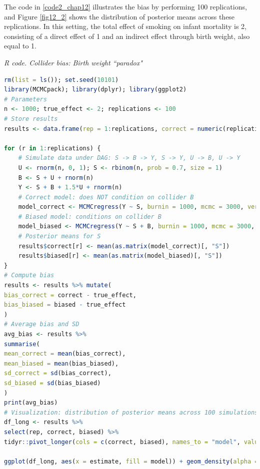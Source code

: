 The code in \ref{code2_chap12} illustrates the bias by performing 100 replications, and Figure \ref{fig12_2} shows the distribution of posterior means across these replications. In this setting, the total effect of smoking on infant mortality is 2, consisting of a direct effect of 1 and an indirect effect through birth weight, also equal to 1.

\begin{tcolorbox}[enhanced,width=4.67in,center upper,
	fontupper=\large\bfseries,drop shadow southwest,sharp corners]\label{code2_chap12}
	\textit{R code. Collider bias: Birth weight ``paradox"}
	\begin{VF}
		\begin{lstlisting}[language=R]		
rm(list = ls()); set.seed(10101)
library(MCMCpack); library(dplyr); library(ggplot2)
# Parameters
n <- 1000; true_effect <- 2; replications <- 100
# Store results
results <- data.frame(rep = 1:replications, correct = numeric(replications), biased = numeric(replications))

for (r in 1:replications) {
	# Simulate data under DAG: S -> B -> Y, S -> Y, U -> B, U -> Y
	U <- rnorm(n, 0, 1); S <- rbinom(n, prob = 0.7, size = 1)
	B <- S + U + rnorm(n)
	Y <- S + B + 1.5*U + rnorm(n)
	# Correct model: does NOT condition on collider B
	model_correct <- MCMCregress(Y ~ S, burnin = 1000, mcmc = 3000, verbose = FALSE)
	# Biased model: conditions on collider B
	model_biased <- MCMCregress(Y ~ S + B, burnin = 1000, mcmc = 3000, verbose = FALSE)
	# Posterior means for S
	results$correct[r] <- mean(as.matrix(model_correct)[, "S"])
	results$biased[r] <- mean(as.matrix(model_biased)[, "S"])
}
# Compute bias
results <- results %>% mutate(
bias_correct = correct - true_effect,
bias_biased = biased - true_effect
)
# Average bias and SD
avg_bias <- results %>%
summarise(
mean_correct = mean(bias_correct),
mean_biased = mean(bias_biased),
sd_correct = sd(bias_correct),
sd_biased = sd(bias_biased)
)
print(avg_bias)
# Visualization: distribution of posterior means across 100 simulations
df_long <- results %>%
select(rep, correct, biased) %>%
tidyr::pivot_longer(cols = c(correct, biased), names_to = "model", values_to = "estimate")

ggplot(df_long, aes(x = estimate, fill = model)) + geom_density(alpha = 0.5) + geom_vline(xintercept = true_effect, color = "black", linetype = "dashed", linewidth = 1) + labs(title = "Posterior Means Across 100 Simulations", x = expression(paste("Posterior Mean of ", beta[S])), y = "Density") + theme_minimal(base_size = 14)
\end{lstlisting}
	\end{VF}
\end{tcolorbox}  

